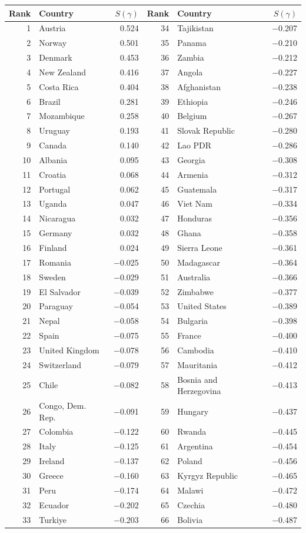 \begin{tabular}{rlr|rlr}
\toprule
Rank & Country & $S(\gamma)$ & Rank & Country & $S(\gamma)$ \\
\midrule
1 & Austria & 0.524 & 34 & Tajikistan & $-$0.207 \\
2 & Norway & 0.501 & 35 & Panama & $-$0.210 \\
3 & Denmark & 0.453 & 36 & Zambia & $-$0.212 \\
4 & New Zealand & 0.416 & 37 & Angola & $-$0.227 \\
5 & Costa Rica & 0.404 & 38 & Afghanistan & $-$0.238 \\
6 & Brazil & 0.281 & 39 & Ethiopia & $-$0.246 \\
7 & Mozambique & 0.258 & 40 & Belgium & $-$0.267 \\
8 & Uruguay & 0.193 & 41 & Slovak Republic & $-$0.280 \\
9 & Canada & 0.140 & 42 & Lao PDR & $-$0.286 \\
10 & Albania & 0.095 & 43 & Georgia & $-$0.308 \\
11 & Croatia & 0.068 & 44 & Armenia & $-$0.312 \\
12 & Portugal & 0.062 & 45 & Guatemala & $-$0.317 \\
13 & Uganda & 0.047 & 46 & Viet Nam & $-$0.334 \\
14 & Nicaragua & 0.032 & 47 & Honduras & $-$0.356 \\
15 & Germany & 0.032 & 48 & Ghana & $-$0.358 \\
16 & Finland & 0.024 & 49 & Sierra Leone & $-$0.361 \\
17 & Romania & $-$0.025 & 50 & Madagascar & $-$0.364 \\
18 & Sweden & $-$0.029 & 51 & Australia & $-$0.366 \\
19 & El Salvador & $-$0.039 & 52 & Zimbabwe & $-$0.377 \\
20 & Paraguay & $-$0.054 & 53 & United States & $-$0.389 \\
21 & Nepal & $-$0.058 & 54 & Bulgaria & $-$0.398 \\
22 & Spain & $-$0.075 & 55 & France & $-$0.400 \\
23 & United Kingdom & $-$0.078 & 56 & Cambodia & $-$0.410 \\
24 & Switzerland & $-$0.079 & 57 & Mauritania & $-$0.412 \\
25 & Chile & $-$0.082 & 58 & Bosnia and Herzegovina & $-$0.413 \\
26 & Congo, Dem. Rep. & $-$0.091 & 59 & Hungary & $-$0.437 \\
27 & Colombia & $-$0.122 & 60 & Rwanda & $-$0.445 \\
28 & Italy & $-$0.125 & 61 & Argentina & $-$0.454 \\
29 & Ireland & $-$0.137 & 62 & Poland & $-$0.456 \\
30 & Greece & $-$0.160 & 63 & Kyrgyz Republic & $-$0.465 \\
31 & Peru & $-$0.174 & 64 & Malawi & $-$0.472 \\
32 & Ecuador & $-$0.202 & 65 & Czechia & $-$0.480 \\
33 & Turkiye & $-$0.203 & 66 & Bolivia & $-$0.487 \\
\bottomrule
\end{tabular}
